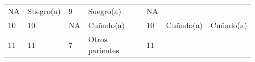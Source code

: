 \documentclass[
]{book}
\begin{document}
\begin{longtable}[]{@{}lllllll@{}}
\begin{minipage}[t]{0.07\columnwidth}
NA\strut
\end{minipage} & \begin{minipage}[t]{0.16\columnwidth}\raggedright
Suegro(a)\strut
\end{minipage} & \begin{minipage}[t]{0.09\columnwidth}\raggedright
9\strut
\end{minipage} & \begin{minipage}[t]{0.16\columnwidth}\raggedright
Suegro(a)\strut
\end{minipage} & \begin{minipage}[t]{0.16\columnwidth}\raggedright
NA\strut
\end{minipage}\tabularnewline
\begin{minipage}[t]{0.10\columnwidth}\raggedright
10\strut
\end{minipage} & \begin{minipage}[t]{0.07\columnwidth}\raggedright
10\strut
\end{minipage} & \begin{minipage}[t]{0.07\columnwidth}\raggedright
NA\strut
\end{minipage} & \begin{minipage}[t]{0.16\columnwidth}\raggedright
Cuñado(a)\strut
\end{minipage} & \begin{minipage}[t]{0.09\columnwidth}\raggedright
10\strut
\end{minipage} & \begin{minipage}[t]{0.16\columnwidth}\raggedright
Cuñado(a)\strut
\end{minipage} & \begin{minipage}[t]{0.16\columnwidth}\raggedright
Cuñado(a)\strut
\end{minipage}\tabularnewline
\begin{minipage}[t]{0.10\columnwidth}\raggedright
11\strut
\end{minipage} & \begin{minipage}[t]{0.07\columnwidth}\raggedright
11\strut
\end{minipage} & \begin{minipage}[t]{0.07\columnwidth}\raggedright
7\strut
\end{minipage} & \begin{minipage}[t]{0.16\columnwidth}\raggedright
Otros parientes\strut
\end{minipage} & \begin{minipage}[t]{0.09\columnwidth}\raggedright
11\strut
\end{minipage} & \begin{minipage}[t]{0.16\columnwidth}\raggedright

\end{minipage}
\end{longtable}
\end{document}
